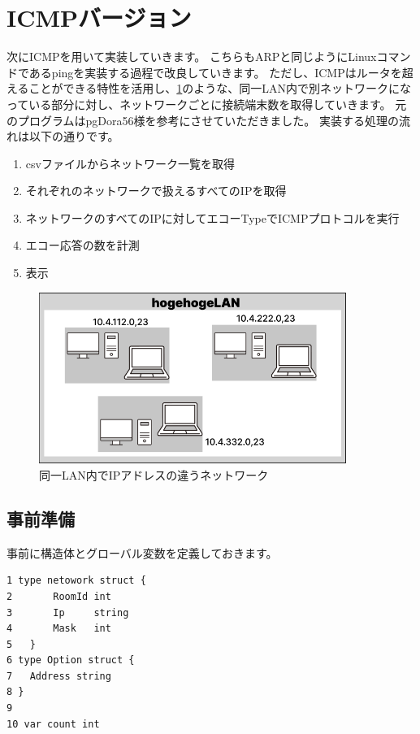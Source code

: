\section{ICMPバージョン}
次にICMPを用いて実装していきます。
こちらもARPと同じようにLinuxコマンドであるpingを実装する過程で改良していきます。
ただし、ICMPはルータを超えることができる特性を活用し、\ref{network}のような、同一LAN内で別ネットワークになっている部分に対し、ネットワークごとに接続端末数を取得していきます。
元のプログラムはpgDora56様を参考にさせていただきました\cite{pgDora56}。
実装する処理の流れは以下の通りです。
\begin{enumerate}
    \item csvファイルからネットワーク一覧を取得
    \item それぞれのネットワークで扱えるすべてのIPを取得
    \item ネットワークのすべてのIPに対してエコーTypeでICMPプロトコルを実行
    \item エコー応答の数を計測
    \item 表示
\end{enumerate}
\begin{figure}[H]
    \centering
    \includegraphics[width=10cm]{image/02-Body/network.png}
    \caption{同一LAN内でIPアドレスの違うネットワーク}
    \label{network}
\end{figure}

\subsection{事前準備}
事前に構造体とグローバル変数を定義しておきます。
\begin{tcolorbox}[breakable]
    \begin{verbatim}
1 type netowork struct {
2       RoomId int
3	    Ip     string
4	    Mask   int
5   }
6 type Option struct {
7	Address string
8 }
9
10 var count int
    \end{verbatim}
\end{tcolorbox}

